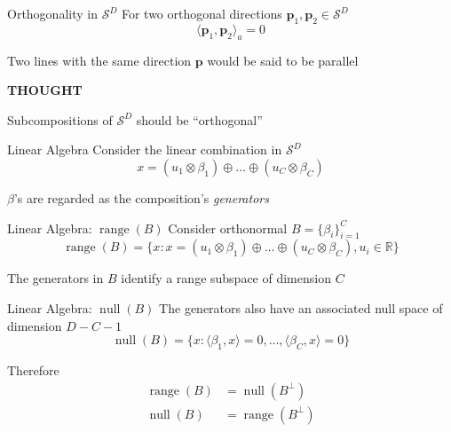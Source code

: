 \documentclass[dark]{cgem-presentation}
\DeclareMathOperator{\range}{\operatorname{range}}
\DeclareMathOperator{\mnull}{\operatorname{null}}
\begin{document}
\begin{frame}{Orthogonality in $\mathcal{S}^D$}
	\LARGE
	For two orthogonal directions $\mathbf{p}_1, \mathbf{p}_2 \in
	\mathcal{S}^D$
	\begin{equation*}
		\langle \mathbf{p}_1, \mathbf{p}_2 \rangle_a = 0
	\end{equation*}

	\vspace{2mm}
	Two lines with the same direction $\mathbf{p}$ would be said
	to be parallel
\end{frame}

\begin{frame}
	\LARGE
	\begin{center}
		\textcolor{SecondColor}{
			\textbf{THOUGHT}
		}

		\vspace{5mm}
		Subcompositions of $\mathcal{S}^D$ should be ``orthogonal''
	\end{center}
\end{frame}

\begin{frame}{Linear Algebra}
	\LARGE
	Consider the linear combination in $\mathcal{S}^D$
	\begin{equation*}
		x = (u_1 \otimes \beta_1) \oplus \ldots \oplus 
		(u_C \otimes \beta_C)
	\end{equation*}

	\vspace{4mm}
	$\beta$'s are regarded as the composition's \textit{generators}
\end{frame}

\begin{frame}{Linear Algebra: $\range(B)$}
	\LARGE
	Consider orthonormal $B = \{ \beta_i \}_{i=1}^C$
	\begin{equation*}
		\range(B) = \{ x : x = (u_1 \otimes \beta_1) \oplus
		\ldots \oplus (u_C \otimes \beta_C), u_i \in \mathbb{R} \}
	\end{equation*}

	The generators in $B$ identify a range subspace of dimension
	$C$
\end{frame}

\begin{frame}{Linear Algebra: $\mnull(B)$}
	\LARGE
	\vspace{5mm}
	The generators also have an associated null space of
	dimension $D - C - 1$
	\begin{equation*}
		\mnull(B) = \{ x : \langle \beta_1, x \rangle = 0, \ldots ,
		\langle \beta_C, x \rangle = 0 \}
	\end{equation*}

	\vspace{5mm}
	Therefore
	\begin{align*}
		\range(B) &= \mnull(B^\perp) \\
		\mnull(B) &= \range(B^\perp)
	\end{align*}
\end{frame}
\end{document}
